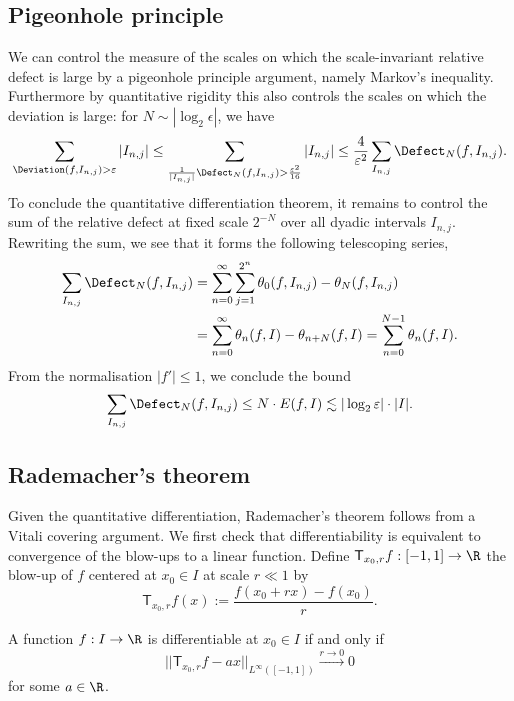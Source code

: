 \subsection{Pigeonhole principle}

We can control the measure of the scales on which the scale-invariant relative defect is large by a pigeonhole principle argument, namely Markov's inequality. Furthermore by quantitative rigidity this also controls the scales on which the deviation is large: for $N \sim |\log_2 \epsilon|$, we have
	\[ \sum_{\Deviation(f, I_{n, j}) > \epsilon} |I_{n, j}| \leq \sum_{\frac{1}{|I_{n, j}|}{\Defect_N} (f, I_{n, j}) > \frac{\epsilon^2}{16}} |I_{n, j}| \leq \frac{4}{\epsilon^2} \sum_{I_{n, j}} \Defect_N (f, I_{n, j}). \]
To conclude the quantitative differentiation theorem, it remains to control the sum of the relative defect at fixed scale $2^{-N}$  over all dyadic intervals $I_{n, j}$. Rewriting the sum, we see that it forms the following telescoping series, 
	\begin{align*}
		 \sum_{I_{n, j}} \Defect_N (f, I_{n, j}) 
		 	&= \sum_{n = 0}^\infty \sum_{j = 1}^{2^n} \theta_0 (f, I_{n, j}) - \theta_N (f, I_{n, j}) \\
		 	&= \sum_{n = 0}^\infty \theta_n (f, I) - \theta_{n + N} (f, I) = \sum_{n = 0}^{N - 1} \theta_n (f, I).
	\end{align*}	 
From the normalisation $|f'| \leq 1$, we conclude the bound 	
	\[ \sum_{I_{n, j}} \Defect_N (f, I_{n, j}) \leq N \cdot E(f, I) \lesssim |\log_2 \epsilon| \cdot |I|. \]

\subsection{Rademacher's theorem}

Given the quantitative differentiation, Rademacher's theorem follows from a Vitali covering argument. We first check that differentiability is equivalent to convergence of the blow-ups to a linear function. Define $\mathsf T_{x_0, r} f : [-1, 1] \to \R$ the blow-up of $f$ centered at $x_0 \in I$ at scale $r \ll 1$ by 
	\[ \mathsf T_{x_0, r} f (x) := \frac{f(x_0 + rx) - f(x_0)}{r}. \]

\begin{proposition}
	A function $f : I \to \R$ is differentiable at $x_0 \in I$ if and only if 
		\[ || \mathsf T_{x_0, r} f - ax||_{L^\infty ([-1, 1])} \overset{r \to 0}{\longrightarrow} 0 \]
	for some $a \in \R$. 	
\end{proposition}

